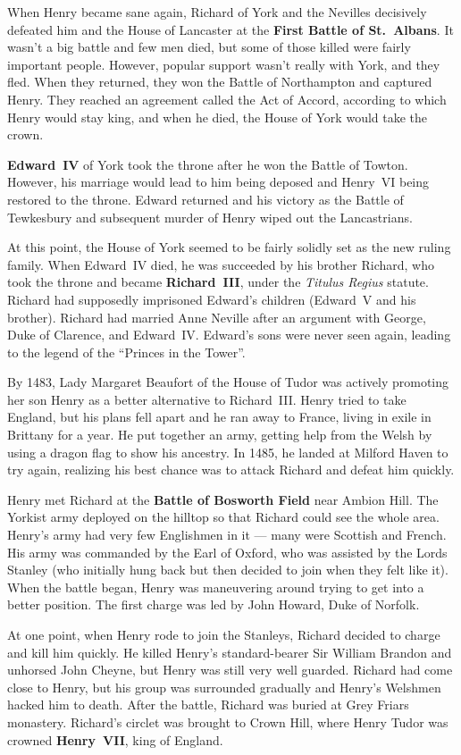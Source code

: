 When Henry became sane again, Richard of York and the Nevilles decisively defeated
him and the House of Lancaster at the \textbf{First Battle of St.\ Albans}.
It wasn't a big battle and few men died, but some of those killed were fairly important people.
However, popular support wasn't really with York, and they fled.
When they returned, they won the Battle of Northampton and captured Henry.
They reached an agreement called the Act of Accord, according to which Henry would stay king,
and when he died, the House of York would take the crown.

\textbf{Edward~IV} of York took the throne after he won the Battle of Towton.
However, his marriage would lead to him being deposed and Henry~VI being restored to the throne.
Edward returned and his victory as the Battle of Tewkesbury
and subsequent murder of Henry wiped out the Lancastrians.

At this point, the House of York seemed to be fairly solidly set as the new ruling family.
When Edward~IV died, he was succeeded by his brother Richard,
who took the throne and became \textbf{Richard~III}, under the \textit{Titulus Regius} statute.
Richard had supposedly imprisoned Edward's children (Edward~V and his brother).
Richard had married Anne Neville after an argument with George, Duke of Clarence, and Edward~IV\@.
Edward's sons were never seen again, leading to the legend of the ``Princes in the Tower''.

By 1483, Lady Margaret Beaufort of the House of Tudor was actively promoting her son Henry
as a better alternative to Richard~III\@.
Henry tried to take England, but his plans fell apart and he ran away to France,
living in exile in Brittany for a year.
He put together an army, getting help from the Welsh by using a dragon flag to show his ancestry.
In 1485, he landed at Milford Haven to try again,
realizing his best chance was to attack Richard and defeat him quickly.

Henry met Richard at the \textbf{Battle of Bosworth Field} near Ambion Hill.
The Yorkist army deployed on the hilltop so that Richard could see the whole area.
Henry's army had very few Englishmen in it --- many were Scottish and French.
His army was commanded by the Earl of Oxford, who was assisted by the Lords Stanley
(who initially hung back but then decided to join when they felt like it).
When the battle began, Henry was maneuvering around trying to get into a better position.
The first charge was led by John Howard, Duke of Norfolk.

At one point, when Henry rode to join the Stanleys, Richard decided to charge and kill him quickly.
He killed Henry's standard-bearer Sir William Brandon and unhorsed John Cheyne,
but Henry was still very well guarded.
Richard had come close to Henry,
but his group was surrounded gradually and Henry's Welshmen hacked him to death.
After the battle, Richard was buried at Grey Friars monastery.
Richard's circlet was brought to Crown Hill,
where Henry Tudor was crowned \textbf{Henry~VII}, king of England.

